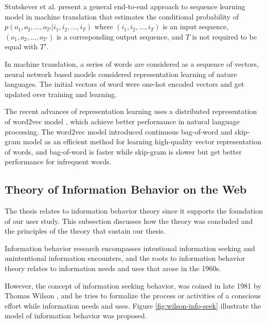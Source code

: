 Stutskever et al. \cite{DBLP:journals/corr/SutskeverVL14} present a general end-to-end approach
to sequence learning model in machine translation that estimates the conditional probability of 
$p(o_1, o_2, ..., o_{T'} | i_1, i_2, ..., i_T)$ where $(i_1, i_2, ..., i_T)$ is an input sequence,
$(o_1, o_2, ..., o_{T'})$ is a corresponding output sequence, and $T$ is not required to be equal with $T'$.

In machine translation, a series of words are considered as a sequence of
vectors, neural network based models considered representation learning of nature languages.
The initial vectors of word were one-hot encoded vectors and get updated over training and learning.

The recent advances of representation learning uses a distributed representation 
of word2vec model \cite{DBLP:journals/corr/abs-1301-3781}, which achieve better 
performance in natural language processing. The word2vec model introduced 
continuous bag-of-word and skip-gram model as an efficient method for learning high-quality
vector representation of words, and bag-of-word is faster while skip-gram is slower but get better
performance for infrequent words.

\subsection{Theory of Information Behavior on the Web}
\label{sec:info-seek}

The thesis relates to information behavior theory since it supports the foundation of our
user study. This subsection discusses how the theory was concluded and 
the principles of the theory that sustain our thesis.

Information behavior research encompasses intentional information seeking and 
unintentional information encounters, and the roots to information behavior 
theory relates to information needs and uses \cite{doi:10.1002/aris.2009.1440430114} 
that arose in the 1960s.

However, the concept of information seeking behavior, was coined in late 1981 
by Thomas Wilson \cite{wilson1981user}, and he tries to formalize the process or 
activities of a conscious effort while information needs 
and uses. Figure \ref{fig:wilson-info-seek} illustrate the model of information behavior 
was proposed.

